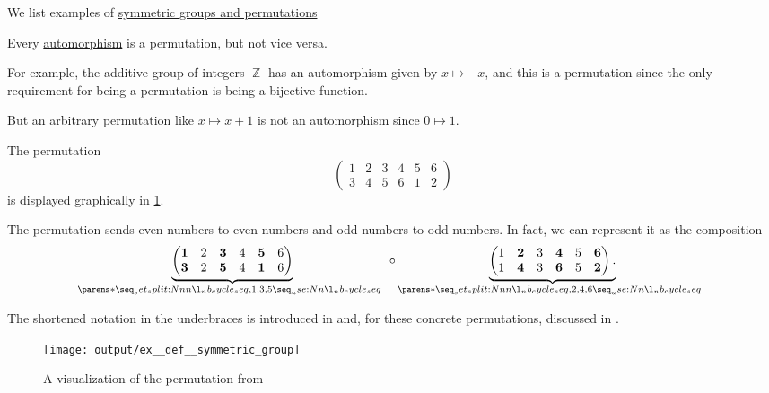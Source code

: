 \begin{example}\label{ex:def:symmetric_group}
  We list examples of \hyperref[def:symmetric_group]{symmetric groups and permutations}
  \begin{thmenum}
     Every \hyperref[def:morphism_invertibility/automorphism]{automorphism} is a permutation, but not vice versa.

    For example, the additive group of integers \( \BbbZ \) has an automorphism given by \( x \mapsto -x \), and this is a permutation since the only requirement for being a permutation is being a bijective function.

    But an arbitrary permutation like \( x \mapsto x + 1 \) is not an automorphism since \( 0 \mapsto 1 \).

     The permutation
    \begin{equation}\label{eq:ex:def:symmetric_group/diamond}
      \begin{pmatrix}
        1 & 2 & 3 & 4 & 5 & 6 \\
        3 & 4 & 5 & 6 & 1 & 2
      \end{pmatrix}
    \end{equation}
    is displayed graphically in \ref{fig:ex:def:symmetric_group/diamond}.

    The permutation sends even numbers to even numbers and odd numbers to odd numbers. In fact, we can represent it as the composition
    \begin{equation*}
      \underbrace
        {
          \begin{pmatrix}
            \mathbf{1} & 2 & \mathbf{3} & 4 & \mathbf{5} & 6 \\
            \mathbf{3} & 2 & \mathbf{5} & 4 & \mathbf{1} & 6
          \end{pmatrix}
        }
        _
        {
          \cycle{ 1, 3, 5 }
        }
      \bincirc
      \underbrace
        {
          \begin{pmatrix}
            1 & \mathbf{2} & 3 & \mathbf{4} & 5 & \mathbf{6} \\
            1 & \mathbf{4} & 3 & \mathbf{6} & 5 & \mathbf{2}
          \end{pmatrix}.
        }
        _
        {
          \cycle{ 2, 4, 6 }
        }
    \end{equation*}

    The shortened notation in the underbraces is introduced in  and, for these concrete permutations, discussed in .

    \begin{figure}
      \centering
      \texttt{[image: output/ex\_\_def\_\_symmetric\_group]}
      \caption{A visualization of the permutation from }
      \label{fig:ex:def:symmetric_group/diamond}
    \end{figure}
  \end{thmenum}
\end{example}

